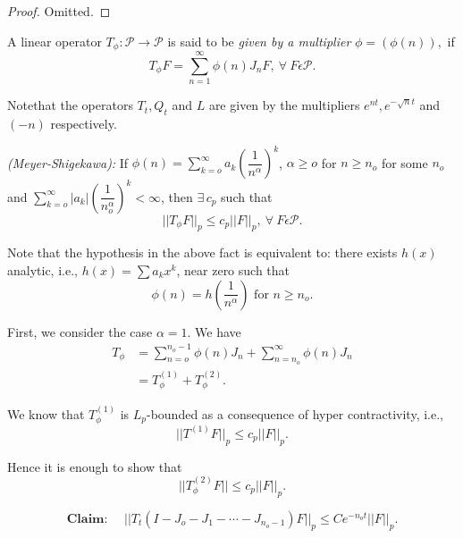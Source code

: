 \begin{proof}
  Omitted.
\end{proof}

\begin{step}\label{chap1:step2}%
A linear operator $T_{\phi}: \mathcal{P} \to \mathcal{P}$ is said to
be \textit{given by a multiplier} $\phi = (\phi (n)), $ if 
$$
T_{\phi} F = \sum_{n = 1}^{\infty} \phi (n) J_n F, ~\forall~ F
\epsilon  \mathcal{P}. 
$$

Note\pageoriginale that the operators $T_t, Q_t$ and $L$  are given by the
multipliers $e^{nt}, e^{-\sqrt{n} t}$ and $(-n)$ respectively. 
\end{step}

\begin{fact}{\em (Meyer-Shigekawa):}
  If $\phi (n) = \sum\limits_{k = o}^{\infty} a_k
  \left(\dfrac{1}{n^\alpha}\right)^k$, $\alpha \ge o$ for $n \ge n_o$ for some
  $n_o$ and $\sum\limits_{k = o}^{\infty} | a_k |
  \left(\dfrac{1}{n^\alpha_o}\right)^k < \infty$, then $\exists\, c_p$ such that  
  \begin{equation*}
    || T_\phi F ||_p \le c_p || F ||_p, ~\forall~ F \epsilon
    \mathcal{P}.\tag{1.10}\label{eq1.10}  
  \end{equation*}
\end{fact}

Note that the hypothesis in the above fact is equivalent to: there
exists $h(x)$ analytic, i.e., $h(x) = \sum a_k x^k$, near zero such
that 
$$
\phi (n) = h \left(\frac{1}{n^\alpha}\right) \text { for } n \ge n_o.
$$

\medskip
{}
  First, we consider the case $\alpha = 1$. We have 
  \begin{align*}
    T_\phi & = \sum_{n = o}^{n_o -1} \phi (n) J_n + \sum_{n =
      n_o}^{\infty} \phi (n) J_n\\ 
    & = T_\phi^{(1)} + T_\phi^{(2)}.
  \end{align*}

We know that $T_\phi^{(1)}$ is $L_p$-bounded as a consequence of
hyper contractivity, i.e., 
$$
|| T^{(1)} F ||_p \le c_p || F ||_p.
$$

Hence it is enough to show that
$$
|| T_\phi^{(2)} F || \le c_p || F ||_p.
$$

\medskip
  \begin{equation*}
    \textbf{Claim: }\quad || T_t (I - J_o - J_1 - \cdots - J_{n_o -1}) F ||_p
    \le C e^{-n_o       t} || F ||_p.\tag{1.11}\label{eq1.11}   
  \end{equation*}

